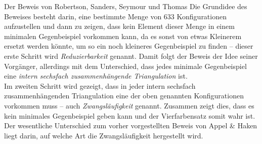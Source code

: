 \begin{chapter}{Der Beweis von Robertson, Sanders, Seymour und Thomas}
  Die Grundidee des Beweises besteht darin, eine bestimmte Menge von 633 Konfigurationen aufzustellen und dann zu zeigen, dass kein Element dieser Menge in einem minimalen Gegenbeispiel vorkommen kann, da es sonst von etwas Kleinerem ersetzt werden könnte, um so ein noch kleineres Gegenbeispiel zu finden -- dieser erste Schritt wird \textit{Reduzierbarkeit} genannt. Damit folgt der Beweis der Idee seiner Vorgänger, allerdings mit dem Unterschied, dass jedes minimale Gegenbeispiel eine \textit{intern sechsfach zusammenhängende Triangulation} ist. \\
  Im zweiten Schritt wird gezeigt, dass in jeder intern sechsfach zusammenhängenden Triangulation eine der oben genannten Konfigurationen vorkommen muss -- auch \textit{Zwangsläufigkeit} genannt. Zusammen zeigt dies, dass es kein minimales Gegenbeispiel geben kann und der Vierfarbensatz somit wahr ist. \\
  Der wesentliche Unterschied zum vorher vorgestellten Beweis von Appel \& Haken liegt darin, auf welche Art die Zwangsläufigkeit hergestellt wird.
  
  
  
 
\end{chapter}
